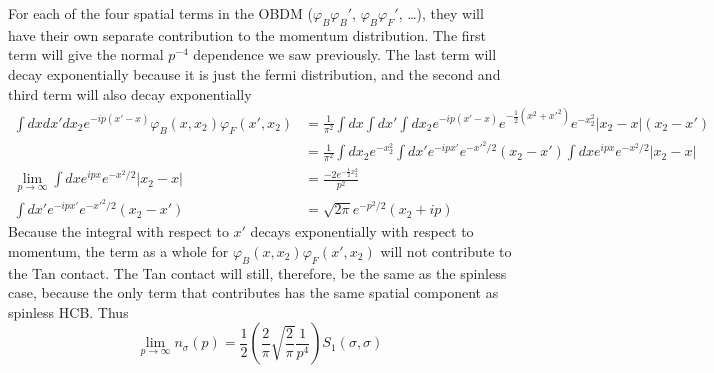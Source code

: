 \documentclass[onecolumn,english,aps,pra]{revtex4}
\begin{document}
%
For each of the four spatial terms in the OBDM ($\varphi_B\varphi_B'$, $\varphi_B\varphi_F'$, \ldots), they will have their own separate contribution to the momentum distribution. The first term will give the normal $p^{-4}$ dependence we saw previously. The last term will decay exponentially because it is just the fermi distribution, and the second and third term will also decay exponentially
\begin{align*}
\int dx dx' dx_2 e^{-ip(x'-x)}\varphi_B(x, x_2)\varphi_F(x', x_2)
& =\frac{1}{\pi^2}\int dx \int dx' \int dx_2 e^{-ip(x'-x)} e^{-\frac{1}{2}(x^2 + x'^2) } e^{-x_2^2}|x_2 - x| (x_2 - x')\\
& =\frac{1}{\pi^2}\int dx_2 e^{-x_2^2} \int dx' e^{-ipx'} e^{-x'^2/2} (x_2 - x') \int dx e^{ipx}e^{-x^2/2}|x_2 - x|\\
\lim_{p \rightarrow \infty} \int dx e^{ipx}e^{-x^2/2}|x_2 - x| &= \frac{-2 e^{-\frac{1}{2} x_2^2}}{p^2}\\
\int dx' e^{-ipx'} e^{-x'^2/2} (x_2 - x') &= \sqrt{2\pi} e^{-p^2/2} (x_2 + ip) 
\end{align*}
Because the integral with respect to $x'$ decays exponentially with respect to momentum, the term as a whole for $\varphi_B(x, x_2)\varphi_F(x', x_2)$ will not contribute to the Tan contact. The Tan contact will still, therefore, be the same as the spinless case, because the only term that contributes has the same spatial component as spinless HCB. Thus
\begin{equation}
\lim_{p \rightarrow \infty} n_{\sigma}(p) =  \frac{1}{2}\left(\frac{2}{\pi} \sqrt{\frac{2}{\pi}} \frac{1}{p^4}\right) S_{1}(\sigma, \sigma)
\end{equation}
\end{document}
